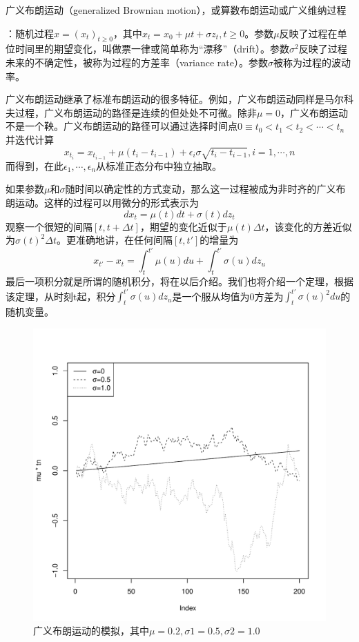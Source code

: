 \documentclass[UTF8]{ctexart}
\newcommand \qd[1] {\begin{qds} {#1} \end{qds}}
\begin{document}
\qd{广义布朗运动（generalized Brownian motion），或算数布朗运动或广义维纳过程}：随机过程$x=(x_t)_{t \geqslant 0}$，其中$x_t=x_0+\mu t +\sigma z_t,t \geqslant 0$。参数$\mu$反映了过程在单位时间里的期望变化，叫做票一律或简单称为“漂移”（drift）。参数$\sigma^2$反映了过程未来的不确定性，被称为过程的方差率（variance rate）。参数$\sigma$被称为过程的波动率。

广义布朗运动继承了标准布朗运动的很多特征。例如，广义布朗运动同样是马尔科夫过程，广义布朗运动的路径是连续的但处处不可微。除非$\mu=0$，广义布朗运动不是一个鞅。广义布朗运动的路径可以通过选择时间点$0 \equiv t_0 <t_1 <t_2< \cdots <t_n$并迭代计算
$$x_{t_i}=x_{t_{i-1}}+\mu(t_i-t_{i-1})+\epsilon_i \sigma \sqrt{t_i-t_{i-1}},i=1,\cdots,n$$
而得到，在此$\epsilon_1,\cdots,\epsilon_n$从标准正态分布中独立抽取。

如果参数$\mu$和$\sigma$随时间以确定性的方式变动，那么这一过程被成为非时齐的广义布朗运动。这样的过程可以用微分的形式表示为
$$dx_t=\mu(t)dt+\sigma(t)dz_t$$
观察一个很短的间隔$[t,t+\Delta t]$，期望的变化近似于$\mu(t)\Delta t$，该变化的方差近似为$\sigma(t)^2 \Delta t$。更准确地讲，在任何间隔$[t,t']$的增量为
$$x_{t'}-x_t=\int_t^{t'}\mu(u)du+\int_t^{t'}\sigma(u)dz_u$$
最后一项积分就是所谓的随机积分，将在以后介绍。我们也将介绍一个定理，根据该定理，从时刻t起，积分$\int_t^{t'}\sigma(u)dz_u$是一个服从均值为0方差为$\int_t^{t'}\sigma(u)^2du$的随机变量。
\begin{figure}[H]
    \centering
    \includegraphics[scale=0.6]{P43.pdf}
    \caption*{广义布朗运动的模拟，其中$\mu=0.2,\sigma 1=0.5,\sigma 2=1.0$}
\end{figure}
\end{document}
